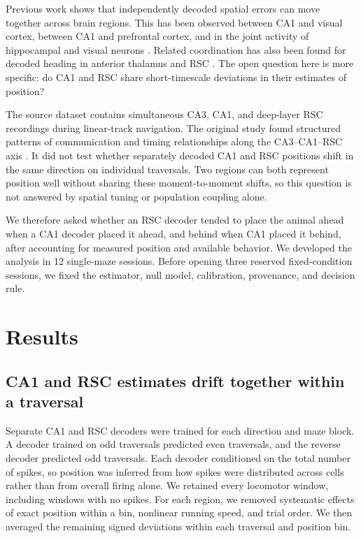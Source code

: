 \documentclass[10pt,twocolumn]{article}
\begin{document}
Previous work shows that independently decoded spatial errors can move together across brain regions. This has been observed between CA1 and visual cortex, between CA1 and prefrontal cortex, and in the joint activity of hippocampal and visual neurons \citep{saleem2018,tang2019,haggerty2015}. Related coordination has also been found for decoded heading in anterior thalamus and RSC \citep{vandergoes2024}. The open question here is more specific: do CA1 and RSC share short-timescale deviations in their estimates of position?

The source dataset contains simultaneous CA3, CA1, and deep-layer RSC recordings during linear-track navigation. The original study found structured patterns of communication and timing relationships along the CA3--CA1--RSC axis \citep{gonzalez2026}. It did not test whether separately decoded CA1 and RSC positions shift in the same direction on individual traversals. Two regions can both represent position well without sharing these moment-to-moment shifts, so this question is not answered by spatial tuning or population coupling alone.

We therefore asked whether an RSC decoder tended to place the animal ahead when a CA1 decoder placed it ahead, and behind when CA1 placed it behind, after accounting for measured position and available behavior. We developed the analysis in 12 single-maze sessions. Before opening three reserved fixed-condition sessions, we fixed the estimator, null model, calibration, provenance, and decision rule.

\section{Results}

\subsection{CA1 and RSC estimates drift together within a traversal}

Separate CA1 and RSC decoders were trained for each direction and maze block. A decoder trained on odd traversals predicted even traversals, and the reverse decoder predicted odd traversals. Each decoder conditioned on the total number of spikes, so position was inferred from how spikes were distributed across cells rather than from overall firing alone. We retained every locomotor window, including windows with no spikes. For each region, we removed systematic effects of exact position within a bin, nonlinear running speed, and trial order. We then averaged the remaining signed deviations within each traversal and position bin.
\end{document}
